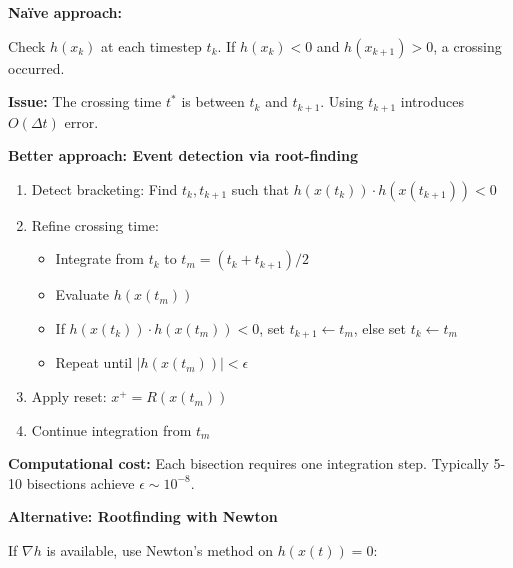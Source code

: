 \documentclass[
  letterpaper,
  DIV=11,
  numbers=noendperiod]{scrartcl}
\providecommand{\tightlist}{%
  \setlength{\itemsep}{0pt}\setlength{\parskip}{0pt}}\usepackage{longtable,booktabs,array}
\begin{document}
\textbf{Naïve approach:}

Check \(h(x_k)\) at each timestep \(t_k\). If \(h(x_k) < 0\) and
\(h(x_{k+1}) > 0\), a crossing occurred.

\textbf{Issue:} The crossing time \(t^*\) is between \(t_k\) and
\(t_{k+1}\). Using \(t_{k+1}\) introduces \(O(\Delta t)\) error.

\textbf{Better approach: Event detection via root-finding}

\begin{tcolorbox}[enhanced jigsaw, coltitle=black, titlerule=0mm, toprule=.15mm, opacitybacktitle=0.6, left=2mm, opacityback=0, rightrule=.15mm, leftrule=.75mm, breakable, colframe=quarto-callout-note-color-frame, bottomtitle=1mm, toptitle=1mm, arc=.35mm, title=\textcolor{quarto-callout-note-color}{\faInfo}\hspace{0.5em}{Algorithm: Bisection Event Detection}, bottomrule=.15mm, colback=white, colbacktitle=quarto-callout-note-color!10!white]

\begin{enumerate}
\def\labelenumi{\arabic{enumi}.}
\tightlist
\item
  Detect bracketing: Find \(t_k, t_{k+1}\) such that
  \(h(x(t_k)) \cdot h(x(t_{k+1})) < 0\)
\item
  Refine crossing time:

  \begin{itemize}
  \tightlist
  \item
    Integrate from \(t_k\) to \(t_m = (t_k + t_{k+1})/2\)
  \item
    Evaluate \(h(x(t_m))\)
  \item
    If \(h(x(t_k)) \cdot h(x(t_m)) < 0\), set \(t_{k+1} \gets t_m\),
    else set \(t_k \gets t_m\)
  \item
    Repeat until \(|h(x(t_m))| < \epsilon\)
  \end{itemize}
\item
  Apply reset: \(x^+ = R(x(t_m))\)
\item
  Continue integration from \(t_m\)
\end{enumerate}

\end{tcolorbox}

\textbf{Computational cost:} Each bisection requires one integration
step. Typically 5-10 bisections achieve \(\epsilon \sim 10^{-8}\).

\textbf{Alternative: Rootfinding with Newton}

If \(\nabla h\) is available, use Newton's method on \(h(x(t)) = 0\):
\end{document}
